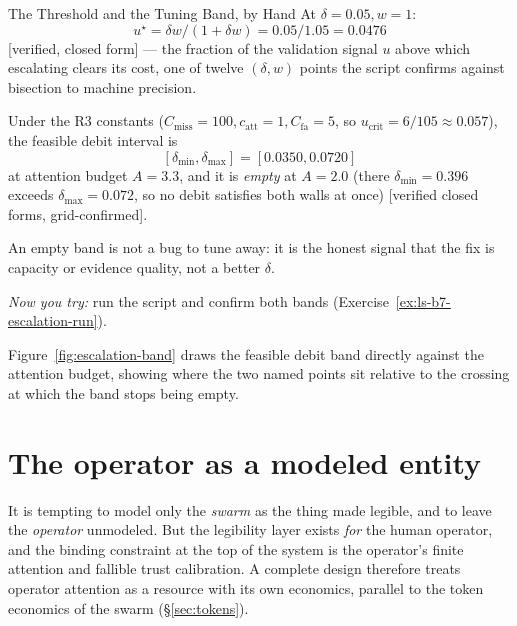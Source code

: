 \documentclass[11pt,a4paper]{article}
\theoremstyle{definition}
\theoremstyle{plain}
\begin{document}
\begin{pdexample}{The Threshold and the Tuning Band, by Hand}
\setlength{\parskip}{4pt plus 1pt}
At $\delta=0.05,w=1$:%
\[
u^\star=\delta w/(1+\delta w)=0.05/1.05=0.0476
\]
[verified, closed form] --- the fraction of the validation signal $u$ above which escalating clears its cost, one of twelve $(\delta,w)$ points the script confirms against bisection to machine precision.

Under the R3 constants ($C_{\mathrm{miss}}=100,c_{\mathrm{att}}=1,C_{\mathrm{fa}}=5$, so $u_{\mathrm{crit}}=6/105\approx0.057$), the feasible debit interval is
\[
[\delta_{\min},\delta_{\max}]=[0.0350,0.0720]
\]
at attention budget $A=3.3$, and it is \emph{empty} at $A=2.0$ (there $\delta_{\min}=0.396$ exceeds $\delta_{\max}=0.072$, so no debit satisfies both walls at once) [verified closed forms, grid-confirmed].

An empty band is not a bug to tune away: it is the honest signal that the fix is capacity or evidence quality, not a better $\delta$.

\emph{Now you try:} run the script and confirm both bands (Exercise~\ref{ex:ls-b7-escalation-run}).
\end{pdexample}

Figure~\ref{fig:escalation-band} draws the feasible debit band directly
against the attention budget, showing where the two named points sit
relative to the crossing at which the band stops being empty.



\section{The operator as a modeled entity}\label{sec:operator}

It is tempting to model only the \emph{swarm} as the thing made legible, and to leave
the \emph{operator} unmodeled. But the legibility layer exists \emph{for} the human
operator, and the binding constraint at the top of the system is the operator's
finite attention and fallible trust calibration. A complete design therefore treats
operator attention as a resource with its own economics, parallel to the token
economics of the swarm (\S\ref{sec:tokens}).
\end{document}
